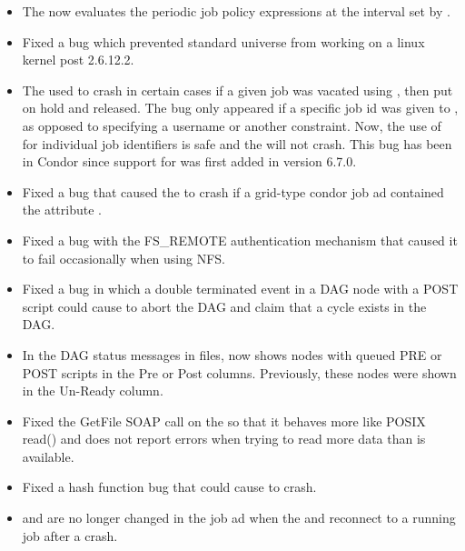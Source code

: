\begin{itemize}
\item The  now evaluates the periodic job policy
expressions at the interval set by .

\item Fixed a bug which prevented standard universe from working on a linux 
kernel post 2.6.12.2.


\item The  used to crash in certain cases if a given
  job was vacated using , then put on hold and
  released.
  The bug only appeared if a specific job id was given to
  , as opposed to specifying a username or another
  constraint.
  Now, the use of  for individual job identifiers
  is safe and the  will not crash.
  This bug has been in Condor since support for 
  was first added in version 6.7.0.

\item Fixed a bug that caused the  to crash if a
grid-type condor job ad contained the attribute .

\item Fixed a bug with the FS\_REMOTE authentication mechanism that caused
it to fail occasionally when using NFS.

\item Fixed a bug in which a double terminated event in a DAG node with
a POST script could cause  to abort the DAG and claim
that a cycle exists in the DAG.

\item In the DAG status messages in  files,
 now shows nodes with queued PRE or POST scripts
in the Pre or Post columns.  Previously, these nodes were shown
in the Un-Ready column.

\item Fixed the GetFile SOAP call on the  so that it
  behaves more like POSIX read() and does not report errors when
  trying to read more data than is available.

\item Fixed a hash function bug that could cause 
to crash.

\item {} and  are no longer
changed in the job ad when the  and  reconnect
to a running job after a crash.


\end{itemize}
